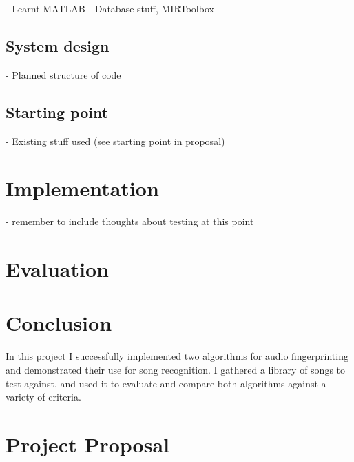 \documentclass[12pt,a4paper,twoside,openright]{report}
\begin{document}
- Learnt MATLAB
- Database stuff, MIRToolbox


\section{System design}

- Planned structure of code


\section{Starting point}

- Existing stuff used (see starting point in proposal)



\chapter{Implementation}

- remember to include thoughts about testing at this point


\chapter{Evaluation}



\chapter{Conclusion}

In this project I successfully implemented two algorithms for audio fingerprinting and demonstrated their use for song recognition. I gathered a library of songs to test against, and used it to evaluate and compare both algorithms against a variety of criteria.






\appendix


\chapter{Project Proposal}


\end{document}
